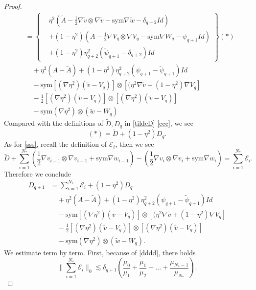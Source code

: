 \documentclass[reqno,12pt]{amsart}
\numberwithin{equation}{section}
\theoremstyle{plain}
\theoremstyle{definition}
\newcommand{\E}{\mathcal{E}}
\newcommand{\sym}{\text{sym}}
\begin{document}
\begin{proof}
\begin{align*}
    &=\left\{\begin{aligned}
      &\eta^2(\tilde A-\frac{1}{2} \nabla\tilde v\otimes\nabla\tilde v-\sym\nabla\tilde w-\delta_{q+2}Id)\\
      & +(1-\eta^2)(A-\frac{1}{2}\nabla V_q\otimes\nabla V_q-\sym\nabla W_q-\psi_{q+1}Id)\\
      & +(1-\eta^2)\eta_{q+2}^2(\tilde \psi_{q+1}-\delta_{q+2})Id
      \end{aligned}\right\}(*)\\
    &\quad + \eta^2(A-\tilde A)+(1-\eta^2)\eta_{q+2}^2(\psi_{q+1}-\tilde\psi_{q+1})Id\\
    &\quad -\sym[(\nabla \eta^2)(\tilde v-V_q)]\otimes[(\eta^2\nabla\tilde v+(1-\eta^2)\nabla V_q]\\
    &\quad -\frac{1}{2}[(\nabla \eta^2)(\tilde v-V_q)]\otimes[(\nabla \eta^2)(\tilde v-V_q)]\\
    &\quad -\sym(\nabla \eta^2)\otimes(\tilde w-W_q)
\end{align*}
Compared with the definitions of $\tilde D,D_q$ in \eqref{tildeD} \eqref{ccc}, we see
\begin{equation}\label{eq*}
    (*) = \tilde D + (1-\eta^2)D_q.
\end{equation}
As for \eqref{sss}, recall the definition of $\E_i$, then we see
\begin{equation*}
    \tilde D+\sum_{i=1}^{N_*}(\frac{1}{2}\nabla  {v}_{i-1}\otimes\nabla  {v}_{i-1}+\sym\nabla   {w}_{i-1})
    -(\frac{1}{2}\nabla  {v}_i\otimes\nabla  {v}_i+\sym\nabla   {w}_i) =\sum_{i=1}^{N_*}\E_i.
\end{equation*}
Therefore we conclude
\begin{align*}
    D_{q+1}&=\sum_{i=1}^{N_*}\E_i +(1-\eta^2)D_q\\
    &\quad +\eta^2(A-\tilde A)+(1-\eta^2)\eta_{q+2}^2(\psi_{q+1}-\tilde\psi_{q+1})Id\\
    &\quad -\sym[(\nabla \eta^2)(\tilde v-V_q)]\otimes[(\eta^2\nabla\tilde v+(1-\eta^2)\nabla V_q]\\
    &\quad -\frac{1}{2}[(\nabla \eta^2)(\tilde v-V_q)]\otimes[(\nabla \eta^2)(\tilde v-V_q)]\\
    &\quad -\sym(\nabla \eta^2)\otimes(\tilde w-W_q).
\end{align*}
We estimate term by term. First, because of \eqref{dddd}, there holds
\begin{equation*}
    \|\sum_{i=1}^{N_*}\E_i\|_0\lesssim\delta_{q+1}(\frac{\mu_0}{\mu_1}+\frac{\mu_1}{\mu_2}+...+\frac{\mu_{N_*-1}}{\mu_{N_*}}).
\end{equation*}

\end{proof}
\end{document}
